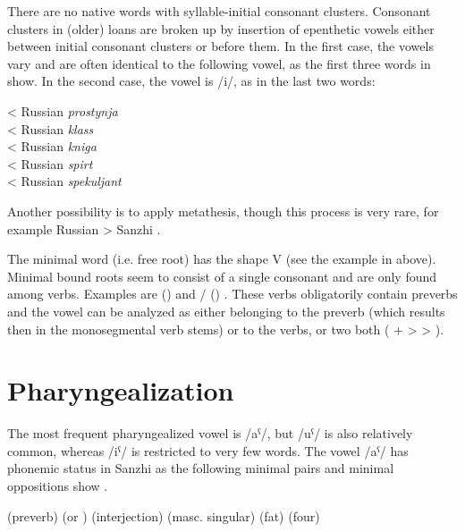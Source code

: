 There are no native words with syllable-initial consonant clusters. Consonant clusters in (older) loans are broken up by insertion of epenthetic vowels either between initial consonant clusters or before them. In the first case, the vowels vary and are often identical to the following vowel, as the first three words in  show. In the second case, the vowel is /i/, as in the last two words:
%
\begin{exe}
	\ex	\label{ex:epenthesis phon}
	\TabPositions{11em}
	 	\tab 	< Russian \textit{prostynja}	\\
		 	\tab 	< Russian \textit{klass}	\\
		 		\tab 	< Russian \textit{kniga}	\\
		 	\tab < Russian \textit{spirt} \\
				  \tab  < Russian \textit{spekuljant} 		
\end{exe}

Another possibility is to apply metathesis, though this process is very rare, for example Russian  > Sanzhi  .

The minimal word (i.e. free root) has the shape V (see the example in  above). Minimal bound roots seem to consist of a single consonant and are only found among verbs. Examples are  ()  and \slash{} () . These verbs obligatorily contain preverbs and the vowel can be analyzed as either belonging to the preverb (which results then in the monosegmental verb stems) or to the verbs, or two both ( +  >  > ).



\section{Pharyngealization}
\label{sec:Pharyngealization}

The most frequent pharyngealized vowel is /aˁ/, but /uˁ/ is also relatively common, whereas /iˁ/ is restricted to very few words. The vowel /aˁ/ has phonemic status in Sanzhi as the following minimal pairs and minimal oppositions show .
%
\begin{exe}
	\ex	\label{ex:pharyngealization minimal pairs A phon@A}
	\begin{xlist}
\TabPositions{13em}
		\ex	{}  \tab {} 
		\ex	{} (preverb)  \tab {} 
		\ex	{}  \tab {} 
		\ex	{} (or ) (interjection) \tab {}  (masc. singular)
		\ex	{}  (fat) \tab {}  (four)
		\ex	{}  \tab {} 
	\end{xlist}
\end{exe}


